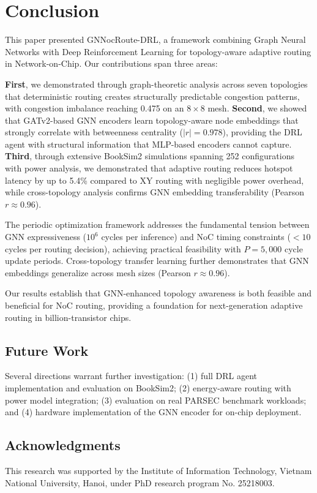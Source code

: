 \section{Conclusion}
\label{sec:conclusion}

This paper presented GNNocRoute-DRL, a framework combining Graph Neural Networks with Deep Reinforcement Learning for topology-aware adaptive routing in Network-on-Chip. Our contributions span three areas:

\textbf{First}, we demonstrated through graph-theoretic analysis across seven topologies that deterministic routing creates structurally predictable congestion patterns, with congestion imbalance reaching 0.475 on an $8\times8$ mesh. \textbf{Second}, we showed that GATv2-based GNN encoders learn topology-aware node embeddings that strongly correlate with betweenness centrality ($|r| = 0.978$), providing the DRL agent with structural information that MLP-based encoders cannot capture. \textbf{Third}, through extensive BookSim2 simulations spanning 252 configurations with power analysis, we demonstrated that adaptive routing reduces hotspot latency by up to 5.4\% compared to XY routing with negligible power overhead, while cross-topology analysis confirms GNN embedding transferability (Pearson $r \approx 0.96$).

The periodic optimization framework addresses the fundamental tension between GNN expressiveness ($10^6$ cycles per inference) and NoC timing constraints ($<10$ cycles per routing decision), achieving practical feasibility with $P = 5,000$ cycle update periods. Cross-topology transfer learning further demonstrates that GNN embeddings generalize across mesh sizes (Pearson $r \approx 0.96$).

Our results establish that GNN-enhanced topology awareness is both feasible and beneficial for NoC routing, providing a foundation for next-generation adaptive routing in billion-transistor chips.

\subsection*{Future Work}
Several directions warrant further investigation: (1) full DRL agent implementation and evaluation on BookSim2; (2) energy-aware routing with power model integration; (3) evaluation on real PARSEC benchmark workloads; and (4) hardware implementation of the GNN encoder for on-chip deployment.

\subsection*{Acknowledgments}
This research was supported by the Institute of Information Technology, Vietnam National University, Hanoi, under PhD research program No. 25218003.

